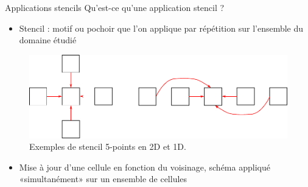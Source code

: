 \documentclass[9pt]{beamer}
\begin{document}
\begin{frame}{\textcolor{inriaGrey}{Applications stencils}}
  \vfill
  Qu'est-ce qu'une application stencil ?
  \vfill
  \begin{itemize}
    \item Stencil : motif ou pochoir que l'on applique par répétition sur
      l'ensemble du domaine étudié
  \end{itemize}
  \vfill
  \begin{figure}
    \centering
    \includegraphics[width=0.6\linewidth]{img/5-points-stencil.pdf}
    \caption{Exemples de stencil 5-points en 2D et 1D.}
  \end{figure}
  \vfill
  \begin{itemize}
  \item<2-> Mise à jour d'une cellule en fonction du voisinage, schéma appliqué
    «simultanément» sur un ensemble de cellules \vfill
\end{itemize}
\end{frame}
\end{document}
